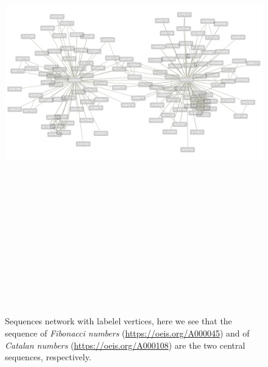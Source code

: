 \newpage
\begin{figure}
\begin{sideways}
\includegraphics[width=20cm, height=20cm]{OEIS/labels}
\caption{Sequences network with labelel vertices, here we see that the sequence
of \textit{Fibonacci numbers} (\url{https://oeis.org/A000045}) and of
\textit{Catalan numbers} (\url{https://oeis.org/A000108}) are the two central
sequences, respectively.}
\end{sideways}
\label{fig:oeis:sequences:network:fibonacci:catalan:labeled}
\end{figure}


\iffalse

